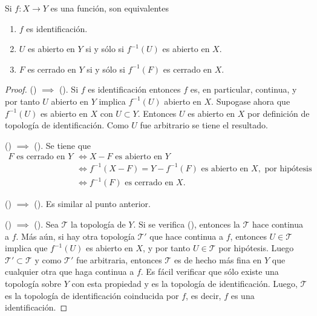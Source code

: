 

\begin{theorem}
Si $f : X \longrightarrow Y$ es una función, son equivalentes
\begin{enumerate}[label=\textnormal{(\roman*)}]
\item $f$ es identificación.
\item $U$ es abierto en $Y$ si y sólo si $f^{-1}(U)$ es abierto en $X$.
\item $F$ es cerrado en $Y$ si y sólo si $f^{-1}(F)$ es cerrado en $X$.
\end{enumerate}
\end{theorem}

\begin{proof}
({\scshape{}}) $\implies$ ({\scshape{}}).  Si $f$ es identificación entonces $f$ es, en particular, continua, y por tanto $U$ abierto en $Y$ implica $f^{-1}(U)$ abierto en $X$. Supogase ahora que $f^{-1}(U)$ es abierto en $X$ con $U \subset Y$. Entonces $U$ es abierto en $X$ por definición de topología de identificación. Como $U$ fue arbitrario se tiene el resultado.
\bigskip

({\scshape{}}) $\implies$ ({\scshape{}}). Se tiene que
\begin{align*}
    F \text{ es cerrado en } Y & \iff X - F \text{ es abierto en } Y \\
                               & \iff f^{-1}(X - F) = Y-f^{-1}(F) \text{ es abierto en } X, \text{ por hipótesis} \\
                               & \iff f^{-1}(F) \text{ es cerrado en } X.
\end{align*}

({\scshape{}}) $\implies$ ({\scshape{}}). Es similar al punto anterior.
\bigskip

({\scshape{}}) $\implies$ ({\scshape{}}). Sea $\mathcal{T}$ la topología de $Y$. Si se verifica ({\scshape{}}), entonces la $\mathcal{T}$ hace continua a $f$. Más aún, si hay otra topología $\mathcal{T'}$ que hace continua a $f$, entonces $U \in \mathcal{T}$ implica que $f^{-1}(U)$ es abierto en $X$, y por tanto $U \in \mathcal{T}$ por hipótesis. Luego $\mathcal{T'} \subset \mathcal{T}$ y como $\mathcal{T'}$ fue arbitraria, entonces $\mathcal{T}$ es de hecho más fina en $Y$ que cualquier otra que haga continua a $f$. Es fácil verificar que sólo existe una topología sobre $Y$ con esta propiedad y es la topología de identificación. Luego, $\mathcal{T}$ es la topología de identificación coinducida por $f$, es decir, $f$ es una identificación.
\end{proof}
